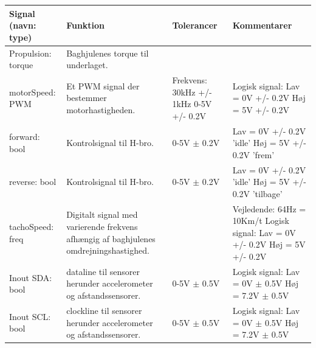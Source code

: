 \begin{table}[h]
	\centering
	\begin{tabularx}{\textwidth}{|l|Z|Z|Z|} \hline
	\textbf{Signal (navn: type)} & \textbf{Funktion} & \textbf{Tolerancer} & \textbf{Kommentarer} \\ \hline

Propulsion: torque
	& Baghjulenes torque til underlaget.
	& ~
	& ~
	\\ \hline

motorSpeed: PWM
	& Et PWM signal der bestemmer motorhastigheden. 
	& Frekvens: 30kHz +/- 1kHz 0-5V +/- 0.2V
 	& Logisk signal: \newline
		Lav = 0V +/- 0.2V \newline
		Høj = 5V +/- 0.2V
	\\ \hline

forward: bool
	& Kontrolsignal til H-bro.
	& 0-5V $\pm$ 0.2V
	& Lav = 0V +/- 0.2V  ’idle’ \newline
		Høj =  5V +/- 0.2V  ’frem’
	\\ \hline
	
reverse: bool
	& Kontrolsignal til H-bro.
	& 0-5V $\pm$ 0.2V
	& Lav = 0V +/- 0.2V ’idle’ \newline
		Høj =  5V +/- 0.2V  ’tilbage’
	\\ \hline
	
tachoSpeed: freq
	& Digitalt signal med varierende frekvens afhængig af baghjulenes 					omdrejningshastighed.
	& ~
	& Vejledende: \newline
		64Hz = 10Km/t \newline
		Logisk signal: \newline
		Lav = 0V +/- 0.2V \newline
		Høj = 5V +/- 0.2V	\\ \hline
	
Inout SDA: bool
	& \IIC dataline til sensorer herunder accelerometer og afstandssensorer. 
	& 0-5V $\pm$ 0.5V
 	& Logisk signal: \newline
		Lav = 0V $\pm$ 0.5V \newline
		Høj = 7.2V $\pm$ 0.5V
	\\ \hline

Inout SCL: bool
	& \IIC clockline  til sensorer herunder accelerometer og afstandssensorer. 
	& 0-5V $\pm$ 0.5V
 	& Logisk signal: \newline
		Lav = 0V $\pm$ 0.5V \newline
		Høj = 7.2V $\pm$ 0.5V
	\\ \hline


\end{tabularx}
\end{table}
